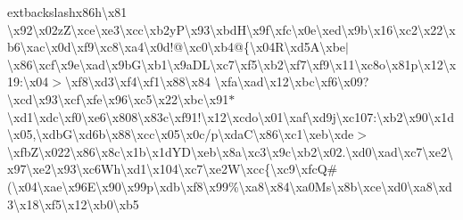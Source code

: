 extbackslash{}x86h\textbackslash{}x81 \textbackslash{}x92\textbackslash{}x02z\+Z\textbackslash{}xce\textbackslash{}xe3\textbackslash{}xcc\textbackslash{}xb2y\+P\textbackslash{}x93\textbackslash{}xbd\+H\textbackslash{}x9f\textbackslash{}xfc\textbackslash{}x0e\textbackslash{}xed\textbackslash{}x9b\textbackslash{}x16\textbackslash{}xc2\textbackslash{}x22\textbackslash{}xb6\textbackslash{}xac\textbackslash{}x0d\textbackslash{}xf9\textbackslash{}xc8\textbackslash{}xa4\textbackslash{}x0d!@\textbackslash{}xc0\textbackslash{}xb4@\{\textbackslash{}x04\+R\textbackslash{}xd5\+A\textbackslash{}xbe$\vert$\textbackslash{}x86\textbackslash{}xcf\textbackslash{}x9e\textbackslash{}xad\textbackslash{}x9b\+G\textbackslash{}xb1\textbackslash{}x9a\+D\+L\textbackslash{}xc7\textbackslash{}xf5\textbackslash{}xb2\textbackslash{}xf7\textbackslash{}xf9\textbackslash{}x11\textbackslash{}xc8o\textbackslash{}x81p\textbackslash{}x12\textbackslash{}x19\+:\textbackslash{}x04$>$\textbackslash{}xf8\textbackslash{}xd3\textbackslash{}xf4\textbackslash{}xf1\textbackslash{}x88\textbackslash{}x84 \textbackslash{}xfa\textbackslash{}xad\textbackslash{}x12\textbackslash{}xbc\textbackslash{}xf6\textbackslash{}x09?\textbackslash{}xcd\textbackslash{}x93\textbackslash{}xcf\textbackslash{}xfe\textbackslash{}x96\textbackslash{}xc5\textbackslash{}x22\textbackslash{}xbc\textbackslash{}x91$\ast$\textbackslash{}xd1\textbackslash{}xdc\textbackslash{}xf0\textbackslash{}xe6\textbackslash{}x808\textbackslash{}x83c\textbackslash{}xf91!\textbackslash{}x12\textbackslash{}xcdo\textbackslash{}x01\textbackslash{}xaf\textbackslash{}xd9j\textbackslash{}xc107\+:\textbackslash{}xb2\textbackslash{}x90\textbackslash{}x1d\textbackslash{}x05,\textbackslash{}xdb\+G\textbackslash{}xd6b\textbackslash{}x88\textbackslash{}xcc\textbackslash{}x05\textbackslash{}x0c/p\textbackslash{}xda\+C\textbackslash{}x86\textbackslash{}xc1\textbackslash{}xeb\textbackslash{}xde$>$\textbackslash{}xfb\+Z\textbackslash{}x022\textbackslash{}x86\textbackslash{}x8c\textbackslash{}x1b\textbackslash{}x1d\+Y\+D\textbackslash{}xeb\textbackslash{}x8a\textbackslash{}xc3\textbackslash{}x9c\textbackslash{}xb2\textbackslash{}x02.\textbackslash{}xd0\textbackslash{}xad\textbackslash{}xc7\textbackslash{}xe2\textbackslash{}x97\textbackslash{}xe2\textbackslash{}x93\textbackslash{}xc6\+Wh\textbackslash{}xd1\textbackslash{}x104\textbackslash{}xc7\textbackslash{}xe2\+W\textbackslash{}xcc\{\textbackslash{}xc9\textbackslash{}xfc\+Q\#(\textbackslash{}x04\textbackslash{}xae\textbackslash{}x96\+E\textbackslash{}x90\textbackslash{}x99p\textbackslash{}xdb\textbackslash{}xf8\textbackslash{}x99\%\textbackslash{}xa8\textbackslash{}x84\textbackslash{}xa0\+Ms\textbackslash{}x8b\textbackslash{}xce\textbackslash{}xd0\textbackslash{}xa8\textbackslash{}xd3\textbackslash{}x18\textbackslash{}xf5\textbackslash{}x12\textbackslash{}xb0\textbackslash{}xb5 